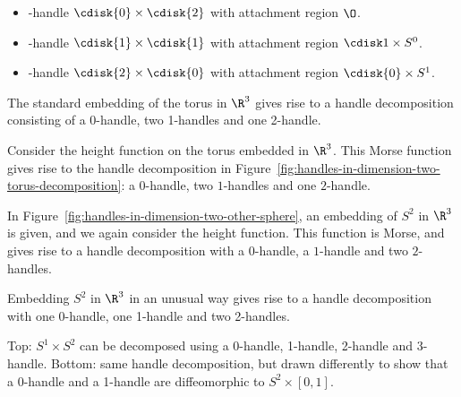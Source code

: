 \begin{itemize}
    \item {}-handle  $\cdisk{0} \times \cdisk{2}$ with attachment region $\O$. \hfill {}
    \item {}-handle  $\cdisk{1} \times \cdisk{1}$ with attachment region $\cdisk1 \times S^{0}$. \hfill{}
    \item {}-handle  $\cdisk{2} \times \cdisk{0}$ with attachment region $\cdisk{0} \times S^1$. \hfill{}
    \end{itemize}
\begin{marginfigure}
    \centering
    \caption{The standard embedding of the torus in $\R^3$ gives rise to a handle decomposition consisting of a 0-handle, two 1-handles and one 2-handle.}
    \label{fig:handles-in-dimension-two-torus-decomposition}
\end{marginfigure}
\begin{eg}
    Consider the height function on the torus embedded in $\R^3$. This Morse function gives rise to the handle decomposition in Figure~\ref{fig:handles-in-dimension-two-torus-decomposition}: a $0$-handle, two $1$-handles and one $2$-handle.
\end{eg}

\begin{eg}
    In Figure~\ref{fig:handles-in-dimension-two-other-sphere}, an embedding of $S^2$ in $\R^3$ is given, and we again consider the height function.
    This function is Morse, and gives rise to a handle decomposition with a $0$-handle, a $1$-handle and two $2$-handles.
\end{eg}
\begin{marginfigure}
    \centering
    \caption{Embedding $S^2$ in $ \R^3$ in an unusual way gives rise to a handle decomposition with one 0-handle, one 1-handle and two 2-handles. }
    \label{fig:handles-in-dimension-two-other-sphere}
\end{marginfigure}
\begin{marginfigure}
    \centering
    \caption{Top: $ S^1 \times S^{2}$ can be decomposed using a 0-handle, 1-handle, 2-handle and 3-handle.
        Bottom: same handle decomposition, but drawn differently to show that  a 0-handle and a 1-handle are diffeomorphic to $S^{2} \times [0,1]$.
}
    \label{fig:handles-in-dimension-three-s1-x-s2}
\end{marginfigure}


